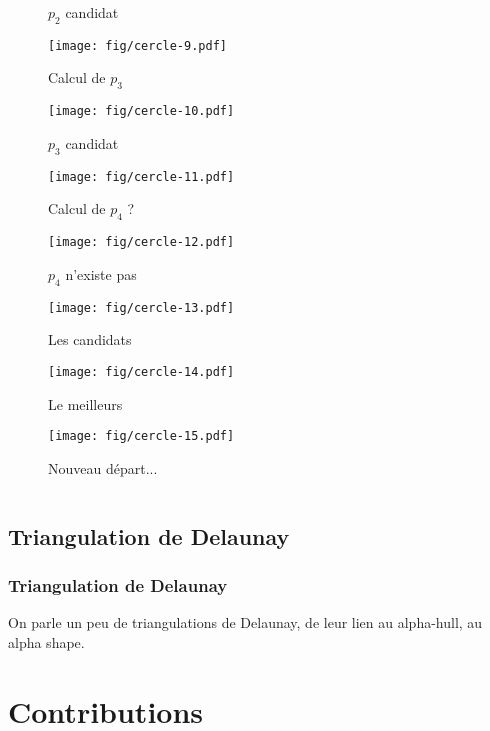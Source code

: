 \documentclass{beamer}
\begin{document}
\begin{frame}
\begin{columns}[t]
\begin{column}{4cm}
{\begin{figure}[h!]
    \caption{$p_{2}$ candidat}
\end{figure}
}
{
  \begin{figure}[h!]
    \centering
    \texttt{[image: fig/cercle-9.pdf]}
    \caption{Calcul de $p_{3}$}
\end{figure}
}
{
  \begin{figure}[h!]
    \centering
    \texttt{[image: fig/cercle-10.pdf]}
    \caption{$p_{3}$ candidat}
\end{figure}
}
{
  \begin{figure}[h!]
    \centering
    \texttt{[image: fig/cercle-11.pdf]}
    \caption{Calcul de $p_{4}$ ?}
\end{figure}
}
{
  \begin{figure}[h!]
    \centering
    \texttt{[image: fig/cercle-12.pdf]}
    \caption{$p_{4}$ n'existe pas}
\end{figure}
}
{
  \begin{figure}[h!]
    \centering
    \texttt{[image: fig/cercle-13.pdf]}
    \caption{Les candidats}
\end{figure}
}
{
  \begin{figure}[h!]
    \centering
    \texttt{[image: fig/cercle-14.pdf]}
    \caption{Le meilleurs}
\end{figure}
}
{
  \begin{figure}[h!]
    \centering
    \texttt{[image: fig/cercle-15.pdf]}
    \caption{Nouveau départ...}
\end{figure}
}


  \end{column}
\end{columns} 

\end{frame}
    
\subsection{Triangulation de Delaunay}  %
\begin{frame}
\frametitle{Triangulation de Delaunay}
On parle un peu de triangulations de Delaunay, de leur lien au alpha-hull, au alpha shape.
\end{frame}

\section{Contributions}
\end{document}
